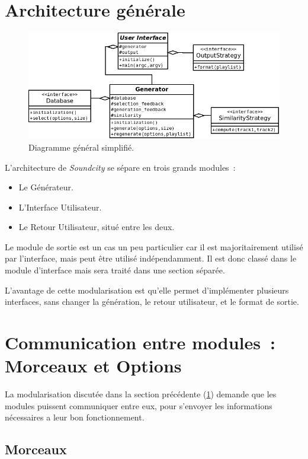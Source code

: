 \section{Architecture générale}
\label{archi:general}

\begin{figure}[H]
\includegraphics[width=\textwidth]{data/archi/general.png}
\caption{Diagramme général simplifié.}
\end{figure}

L'architecture de \emph{Soundcity} se sépare en trois grands modules~:
\begin{itemize}
  \item Le Générateur.
  \item L'Interface Utilisateur.
  \item Le Retour Utilisateur, situé entre les deux.
\end{itemize}

Le module de sortie est un cas un peu particulier car il est majoritairement
utilisé par l'interface, mais peut être utilisé indépendamment. Il est donc
classé dans le module d'interface mais sera traité dans une section séparée.

L'avantage de cette modularisation est qu'elle permet d'implémenter plusieurs
interfaces, sans changer la génération, le retour utilisateur, et le format de
sortie.

\section{Communication entre modules~: Morceaux et Options}
\label{archi:communication}

La modularisation discutée dans la section précédente (\ref{archi:general})
demande que les modules puissent communiquer entre eux, pour s'envoyer les
informations nécessaires a leur bon fonctionnement.

\subsection{Morceaux}
\label{archi:communication:track}

